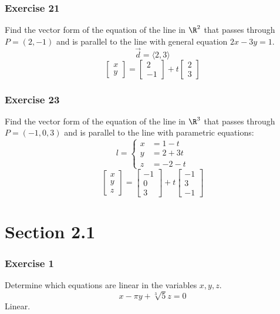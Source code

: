 \documentclass{math}
\begin{document}
\subsubsection*{Exercise 21}
Find the vector form of the equation of the line in \( \R^2 \) that passes
through \( P = (2,-1) \) and is parallel to the line with general equation
\( 2x-3y = 1 \).
\[ \vec{d} = \langle2,3\rangle \]
\[ \begin{bmatrix}x \\ y\end{bmatrix} =
  \begin{bmatrix}2 \\ -1\end{bmatrix}+
  t\begin{bmatrix}2 \\ 3\end{bmatrix} \]

\subsubsection*{Exercise 23}
Find the vector form of the equation of the line in \( \R^3 \) that passes
through \( P = (-1,0,3) \) and is parallel to the line with parametric
equations:
\[ l = \begin{cases}
  x &= 1-t \\
  y &= 2+3t \\
  z &= -2-t
\end{cases} \]
\[ \begin{bmatrix}x \\ y \\ z\end{bmatrix} =
  \begin{bmatrix}-1 \\ 0 \\ 3\end{bmatrix}+
  t\begin{bmatrix}-1 \\ 3 \\ -1\end{bmatrix} \]

\section*{Section 2.1}

\subsubsection*{Exercise 1}
Determine which equations are linear in the variables \( x,y,z \).
\[ x-\pi y+\sqrt[3]{5}z = 0 \]
Linear.
\end{document}
